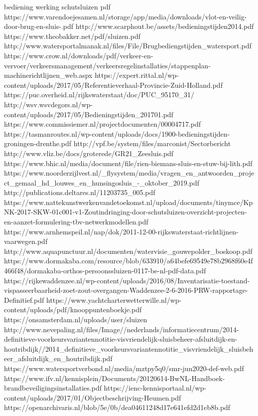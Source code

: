 bediening werking schutsluizen pdf
https://www.varendoejesamen.nl/storage/app/media/downloads/vlot-en-veilig-door-brug-en-sluis-.pdf
http://www.scarphout.be/assets/bedieningstijden2014.pdf
https://www.theobakker.net/pdf/sluizen.pdf
http://www.watersportalmanak.nl/files/File/Brugbediengstijden_watersport.pdf
https://www.crow.nl/downloads/pdf/verkeer-en-vervoer/verkeersmanagement/verkeersregelinstallaties/stappenplan-machinerichtlijnen_web.aspx
https://expert.rittal.nl/wp-content/uploads/2017/05/Referentieverhaal-Provincie-Zuid-Holland.pdf
https://puc.overheid.nl/rijkswaterstaat/doc/PUC_95170_31/
http://wsv.wsvdegors.nl/wp-content/uploads/2017/05/Bedieningstijden_201701.pdf
https://www.commissiemer.nl/projectdocumenten/00004717.pdf
https://tasmanroutes.nl/wp-content/uploads/docs/1900-bedieningstijden-groningen-drenthe.pdf
http://vpf.be/system/files/marconist/Sectorbericht%
http://www.vliz.be/docs/groterede/GR21_Zeesluis.pdf
https://www.bhic.nl/media/document/file/rien-biemans-sluis-en-stuw-bij-lith.pdf
https://www.noorderzijlvest.nl/_flysystem/media/vragen_en_antwoorden_project_gemaal_hd_louwes_en_hunsingosluis_-_oktober_2019.pdf
http://publications.deltares.nl/11203735_005.pdf
https://www.nattekunstwerkenvandetoekomst.nl/upload/documents/tinymce/KpNK-2017-SKW-01c001-v1-Zoutindringing-door-schutsluizen-overzicht-projecten-en-aanzet-formulering-tbv-netwerkmodellen.pdf
https://www.arnhemspeil.nl/nap/dok/2011-12-00-rijkswaterstaat-richtlijnen-vaarwegen.pdf
http://www.aquapunctuur.nl/documenten/watervisie_gouwepolder_boskoop.pdf
https://www.dormakaba.com/resource/blob/633910/a64befe69549e78b2968f60e4f466f48/dormakaba-orthos-persoonssluizen-0117-be-nl-pdf-data.pdf
https://rijkewaddenzee.nl/wp-content/uploads/2016/08/Inventarisatie-toestand-vispasseerbaarheid-zoet-zout-overgangen-Waddenzee-2-6-2016-PRW-rapportage-Definitief.pdf
https://www.yachtcharterwetterwille.nl/wp-content/uploads/pdf/knooppuntenboekje.pdf
https://onsamsterdam.nl/uploads/user/sluizen%
http://www.nevepaling.nl/files/Image//nederlands/informatiecentrum/2014-definitieve-voorkeursvariantennotitie-visvriendelijk-sluisbeheer-afsluitdijk-en-houtribdijk//2014_definitieve_voorkeursvariantennotitie_visvriendelijk_sluisbeheer_afsluitdijk_en_houtribdijk.pdf
https://www.watersportverbond.nl/media/mztpy5q0/smr-jun2020-def-web.pdf
https://www.ifv.nl/kennisplein/Documents/20120614-BwNL-Handboek-brandbeveiligingsinstallaties.pdf
https://ienc-kennisportaal.nl/wp-content/uploads/2017/01/Objectbeschrijving-Heumen.pdf
https://openarchivaris.nl/blob/5e/0b/dea04611248d17e641efd2d1eb8b.pdf
